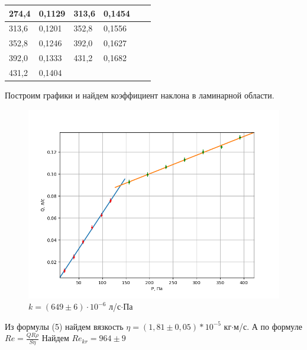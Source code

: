 \documentclass[12pt]{article}
\begin{document}
\begin{table}[H]
\begin{tabular}{|l|l|l|l|l|l|}
		274,4                                                         & 0,1129   & 313,6                               & 0,1454   &                                     &          \\ \hline
		313,6                                                         & 0,1201   & 352,8                               & 0,1556   &                                     &          \\ \hline
		352,8                                                         & 0,1246   & 392,0                               & 0,1627   &                                     &          \\ \hline
		392,0                                                         & 0,1333   & 431,2                               & 0,1682   &                                     &          \\ \hline
		431,2                                                         & 0,1404   &                                     &          &                                     &          \\ \hline
	\end{tabular}
\end{table}

Построим графики и найдем коэффициент наклона в ламинарной области.
\begin{figure}[H]
	\centering
	\includegraphics[scale=0.55]{./images/d4mm1.png}
	\caption{$k = (649\pm6)\cdot 10^{-6}$ л/с$\cdot$Па}
\end{figure}

Из формулы (5) найдем вязкость $\eta = (1,81\pm 0,05)*10^{-5}$ кг$\cdot$м/с. А по формуле $Re = \frac{QR\rho}{S\eta}$
Найдем $Re_{kr} = 964\pm9$
\end{document}
